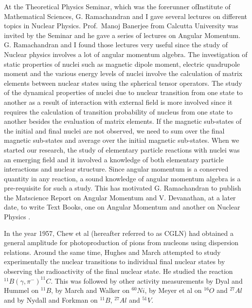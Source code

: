 At the Theoretical Physics Seminar, which was the forerunner of\break Institute of Mathematical Sciences, G. Ramachandran and I gave several lectures on different topics in Nuclear Physics. Prof.\ Manoj Banerjee from Calcutta University was invited by the Seminar and he gave a series of lectures on Angular Momentum. G. Ramachandran and I found those lectures very useful since the study of Nuclear physics involves a lot of angular momentum algebra. The investigation of static properties of nuclei such as magnetic dipole moment, electric quadru\-pole moment and the various energy levels of nuclei involve the calculation of matrix elements between nuclear states using the spherical tensor operators. The study of the dynamical properties of nuclei due to nuclear transition from one state to another as a result of interaction with external field is more involved since it requires the calculation of transition probability of nucleus from one state to another besides the evaluation of matrix elements. If the magnetic sub-states of the initial and final nuclei are not observed, we need to sum over the final magnetic sub-states and average over the initial magnetic sub-states. When we started our research, the study of elementary particle reactions with nuclei was an emerging field and it involved a knowledge of both elementary particle interactions and nuclear structure. Since angular momentum is a conserved quantity in any reaction, a sound knowledge of angular momentum algebra is a pre-requisite for such a study. This has motivated G. Ramachandran to publish the Matscience Report on Angular Momentum \cite{chap3-key10} and V. Devanathan, at a later date, to write Text Books, one on Angular Momentum \cite{chap3-key11} and another on Nuclear Physics \cite{chap3-key12}.

In the year 1957, Chew et al (hereafter referred to as CGLN) \cite{chap3-key13} had obtained a general amplitude for photoproduction of pions from nucleons using dispersion relations. Around the same time, Hughes and March \cite{chap3-key14} attempted to study experimentally the nuclear transitions to individual final nuclear states by observing the radioactivity of the final nuclear state. He studied the reaction ${}^{11} B(\gamma, \pi^-)^{11} C$. This was followed by other activity measurements by Dyal and Hummel \cite{chap3-key15} on ${}^{11} B$, by March and Walker \cite{chap3-key16} on ${}^{60} N i$, by Meyer et al \cite{chap3-key17} on ${}^{16} O$ and ${}^{27} Al$ and by Nydall and Forkman \cite{chap3-key18} on ${}^{11} B$, ${}^{27} Al$ and ${}^{51} V$.

